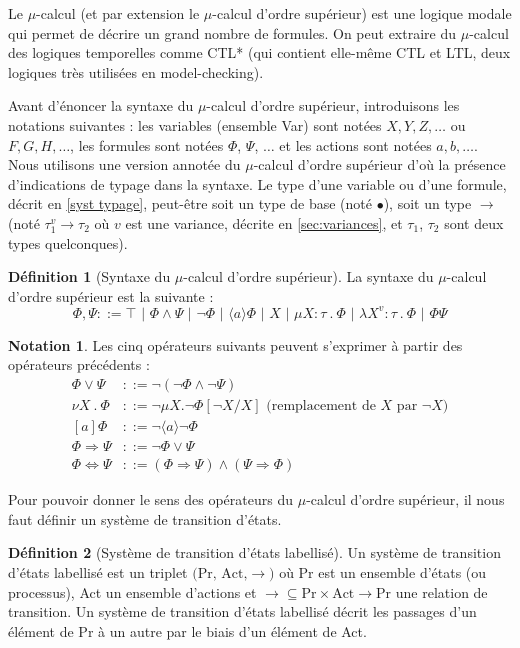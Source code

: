 \documentclass{rapport}
\theoremstyle{plain}
\theoremstyle{remark}
\theoremstyle{definition}
\newtheorem{notat}{Notation}
\newtheorem{dfn}{Définition}
\begin{document}
Le $\mu$-calcul (et par extension le $\mu$-calcul d'ordre supérieur) est une logique modale qui permet de décrire un grand nombre de formules. On peut extraire du $\mu$-calcul des logiques temporelles comme CTL* (qui contient elle-même CTL et LTL, deux logiques très utilisées en model-checking). 

Avant d'énoncer la syntaxe du $\mu$-calcul d'ordre supérieur, introduisons les notations suivantes : les variables (ensemble Var) sont notées $X, Y, Z, \ldots$ ou $F, G, H, \ldots$, les formules sont notées $\Phi$, $\Psi$, $\ldots$ et les actions sont notées $a, b, \ldots$. Nous utilisons une version annotée du $\mu$-calcul d'ordre supérieur d'où la présence d'indications de typage dans la syntaxe. Le type d'une variable ou d'une formule, décrit en \ref{syst typage}, peut-être soit un type de base (noté $\bullet$), soit un type $\rightarrow$ (noté $\tau_1^{v} \rightarrow \tau_2$ où $v$ est une variance, décrite en \ref{sec:variances}, et $\tau_1$, $\tau_2$ sont deux types quelconques).

\begin{dfn}[Syntaxe du $\mu$-calcul d'ordre supérieur] La syntaxe du $\mu$-calcul d'ordre supérieur est la suivante :
\[\Phi, \Psi ::= \top \text{ | } \Phi \wedge \Psi \text{ | } \neg\Phi \text{ | } \langle a \rangle \Phi \text{ | } X \text{ | } \mu X : \tau \ . \ \Phi \text{ | } \lambda X^{v} : \tau \ . \ \Phi \text{ | } \Phi \Psi\]
\end{dfn}\label{def:syntaxe}

\begin{notat} Les cinq opérateurs suivants peuvent s'exprimer à partir des opérateurs précédents : 
\begin{align*}
	\Phi \vee \Psi &::= \neg (\neg \Phi \wedge \neg \Psi)\\
	\nu X \ . \ \Phi &::= \neg \mu X . \neg \Phi [\neg X/X] \text{ (remplacement de } X \text{ par } \neg X)\\
	[a] \Phi &::= \neg \langle a \rangle \neg \Phi\\
	\Phi \Rightarrow \Psi &::= \neg \Phi \vee \Psi\\
	\Phi \Leftrightarrow \Psi &::= (\Phi \Rightarrow \Psi) \wedge (\Psi \Rightarrow \Phi)
\end{align*}
\end{notat}

Pour pouvoir donner le sens des opérateurs du $\mu$-calcul d'ordre supérieur, il nous faut définir un système de transition d'états. 

\begin{dfn}[Système de transition d'états labellisé] Un système de transition d'états labellisé est un triplet $\text{(Pr, Act,} \rightarrow)$ où Pr est un ensemble d'états (ou processus), Act un ensemble d'actions et ${\rightarrow \subseteq \text{Pr} \times \text{Act} \rightarrow \text{Pr}}$ une relation de transition. Un système de transition d'états labellisé décrit les passages d'un élément de Pr à un autre par le biais d'un élément de Act.  
\end{dfn}
\end{document}
